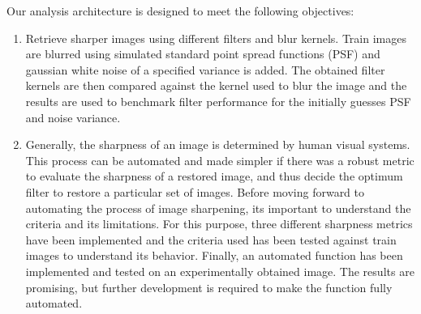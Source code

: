 \noindent Our analysis architecture is designed to meet the following objectives:
\begin{enumerate}
\item  Retrieve sharper images using different filters and blur kernels. Train images are blurred using simulated standard point spread functions (PSF) and gaussian white noise of a specified variance is added. The obtained filter kernels are then compared against the kernel used to blur the image and the results are used to benchmark filter performance for the initially guesses PSF and noise variance. 
\item Generally, the sharpness of an image is determined by human visual systems. This process can be automated and made simpler if there was a robust metric to evaluate the sharpness of a restored image, and thus decide the optimum filter to restore a particular set of images. Before moving forward to automating the process of image sharpening, its important to understand the criteria and its limitations. For this purpose, three different sharpness metrics have been implemented and the criteria used has been tested against train images to understand its behavior. Finally, an automated function has been implemented and tested on an experimentally obtained image. The results are promising, but further development is required to make the function fully automated.

\end{enumerate}
\newpage